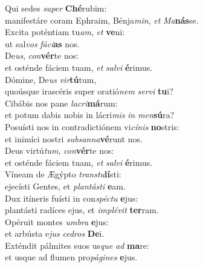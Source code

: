 \evenverse Qui sedes \textit{su}\textit{per} \textbf{Ché}rubim:~\*\\
\evenverse manifestáre coram Ephraim, Bénja\textit{min}, \textit{et} \textit{Ma}\textbf{nás}se.\\
\oddverse Excita poténtiam tu\textit{am}, \textit{et} \textbf{ve}ni:~\*\\
\oddverse ut sal\textit{vos} \textit{fá}\textit{ci}\textbf{as} nos.\\
\evenverse De\textit{us}, \textit{con}\textbf{vér}te nos:~\*\\
\evenverse et osténde fáciem tuam, \textit{et} \textit{sal}\textit{vi} \textbf{é}rimus.\\
\oddverse Dómine, De\textit{us} \textit{vir}\textbf{tú}tum,~\*\\
\oddverse quoúsque irascéris super oratió\textit{nem} \textit{ser}\textit{vi} \textbf{tu}i?\\
\evenverse Cibábis nos pane \textit{la}\textit{cri}\textbf{má}rum:~\*\\
\evenverse et potum dabis nobis in lácri\textit{mis} \textit{in} \textit{men}\textbf{sú}ra?\\
\oddverse Posuísti nos in contradictiónem vi\textit{cí}\textit{nis} \textbf{no}stris:~\*\\
\oddverse et inimíci nostri \textit{sub}\textit{san}\textit{na}\textbf{vé}runt nos.\\
\evenverse Deus virtú\textit{tum}, \textit{con}\textbf{vér}te nos:~\*\\
\evenverse et osténde fáciem tuam, \textit{et} \textit{sal}\textit{vi} \textbf{é}rimus.\\
\oddverse Víneam de Ægýpto \textit{tran}\textit{stu}\textbf{lí}sti:~\*\\
\oddverse ejecísti Gentes, et \textit{plan}\textit{tá}\textit{sti} \textbf{e}am.\\
\evenverse Dux itíneris fuísti in con\textit{spé}\textit{ctu} \textbf{e}jus:~\*\\
\evenverse plantásti radíces ejus, et \textit{im}\textit{plé}\textit{vit} \textbf{ter}ram.\\
\oddverse Opéruit montes \textit{um}\textit{bra} \textbf{e}jus:~\*\\
\oddverse et arbústa e\textit{jus} \textit{ce}\textit{dros} \textbf{De}i.\\
\evenverse Exténdit pálmites suos us\textit{que} \textit{ad} \textbf{ma}re:~\*\\
\evenverse et usque ad flumen pro\textit{pá}\textit{gi}\textit{nes} \textbf{e}jus.\\
